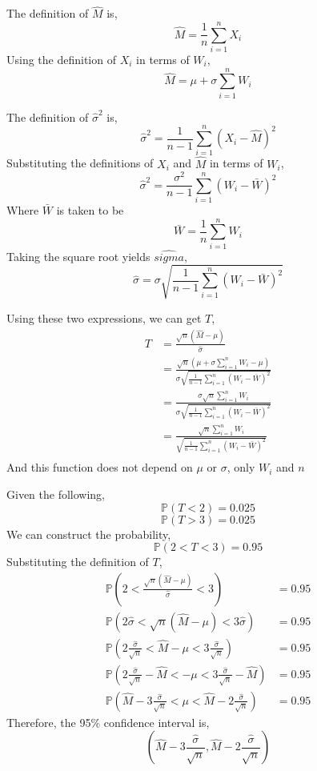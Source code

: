 \documentclass[12pt,twoside]{article}
\begin{document}
\begin{problems}
\begin{problemparts}
\problempart %

The definition of $\hat{M}$ is,
$$ \hat{M} = \frac{1}{n} \sum_{i = 1}^n X_i $$
Using the definition of $X_i$ in terms of $W_i$,
$$ \hat{M} = \mu + \sigma \sum_{i = 1}^n W_i $$

The definition of $\hat{\sigma}^2$ is,
$$ \hat{\sigma}^2 = \frac{1}{n - 1} \sum_{i = 1}^n (X_i - \hat{M})^2 $$
Substituting the definitions of $X_i$ and $\hat{M}$ in terms of $W_i$,
$$ \hat{\sigma}^2 = \frac{\sigma^2}{n - 1} \sum_{i = 1}^n (W_i - \bar{W})^2 $$
Where $\bar{W}$ is taken to be
$$ \bar{W} = \frac{1}{n} \sum_{i = 1}^n W_i $$
Taking the square root yields $\hat{sigma}$,
$$ \hat{\sigma} = \sigma \sqrt{\frac{1}{n - 1} \sum_{i = 1}^n (W_i - \bar{W})^2} $$

Using these two expressions, we can get $T$,
\begin{align*}
    T &= \frac{\sqrt{n} \left(\hat{M} - \mu\right)}{\hat{\sigma}} \\
    &= \frac{\sqrt{n} \left(\mu + \sigma \sum_{i = 1}^n W_i - \mu \right)}{\sigma
    \sqrt{\frac{1}{n - 1} \sum_{i = 1}^n (W_i - \bar{W})^2}} \\
    &= \frac{\sigma \sqrt{n} \sum_{i = 1}^n W_i}{\sigma \sqrt{\frac{1}{n - 1} 
    \sum_{i = 1}^n (W_i - \bar{W})^2}} \\
    &= \boxed{\frac{\sqrt{n} \sum_{i = 1}^n W_i}{\sqrt{\frac{1}{n - 1} \sum_{i = 1}^n 
    (W_i - \bar{W})^2}}} \\
\end{align*}
And this function does not depend on $\mu$ or $\sigma$, only $W_i$ and $n$
   
\problempart %

Given the following,
$$ \mathbb{P}(T < 2) = 0.025 $$
$$ \mathbb{P}(T > 3) = 0.025 $$
We can construct the probability,
$$ \mathbb{P}(2 < T < 3) = 0.95 $$
Substituting the definition of $T$,
\begin{align*}
    \mathbb{P}\left(2 < \frac{\sqrt{n} \left(\hat{M} - \mu\right)}{\hat{\sigma}} < 
    3 \right) &= 0.95 \\
    \mathbb{P}\left(2 \hat{\sigma} < \sqrt{n} \left(\hat{M} - \mu\right) < 3 
    \hat{\sigma} \right) &= 0.95 \\
    \mathbb{P}\left(2 \frac{\hat{\sigma}}{\sqrt{n}} < \hat{M} - \mu < 3 
    \frac{\hat{\sigma}}{\sqrt{n}} \right) &= 0.95 \\
    \mathbb{P}\left(2 \frac{\hat{\sigma}}{\sqrt{n}} - \hat{M} < -\mu < 3 
    \frac{\hat{\sigma}}{\sqrt{n}} - \hat{M} \right) &= 0.95 \\
    \mathbb{P}\left(\hat{M} - 3 \frac{\hat{\sigma}}{\sqrt{n}} < \mu < \hat{M} - 2
    \frac{\hat{\sigma}}{\sqrt{n}} \right) &= 0.95 
\end{align*}
Therefore, the 95\% confidence interval is,
$$ \boxed{\left(\hat{M} - 3 \frac{\hat{\sigma}}{\sqrt{n}}, \hat{M} - 2
\frac{\hat{\sigma}}{\sqrt{n}}\right)} $$


\end{problemparts}
\end{problems}
\end{document}
